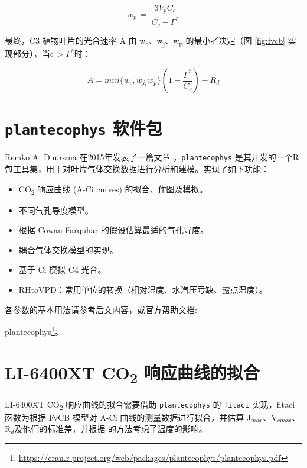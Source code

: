 \documentclass[]{krantz}
\providecommand{\tightlist}{%
  \setlength{\itemsep}{0pt}\setlength{\parskip}{0pt}}
\renewcommand{\href}[2]{#2\footnote{\url{#1}}}
\theoremstyle{definition}
\theoremstyle{definition}
\theoremstyle{definition}
\theoremstyle{remark}
\begin{document}
\begin{equation}
w_{p\ }=\ \frac{3V_{p}C_{c}}{C_{c}-\Gamma^{*}}
\end{equation}

最终，C3 植物叶片的光合速率 A 由
w\textsubscript{c}、w\textsubscript{j}、w\textsubscript{p}
的最小者决定（图 \ref{fig:fvcb} 实现部分），当c \textgreater{}
\(\Gamma^{*}\)时：

\begin{equation}
A=min\{w_{c},w_{j,}w_{p}\}(1-\frac{\Gamma^{*}}{C_{c}})-R_{d}
\end{equation}

\section{\texorpdfstring{\texttt{plantecophys}
软件包}{plantecophys 软件包}}\label{plantecophys-}

Remko A. Duursma 在2015年发表了一篇文章
\citet{Duursma2015Plantecophys}，\texttt{plantecophys}
是其开发的一个R包工具集，用于对叶片气体交换数据进行分析和建模。实现了如下功能：

\begin{itemize}
\tightlist
\item
  CO\textsubscript{2} 响应曲线 (A-Ci curves) 的拟合、作图及模拟。
\item
  不同气孔导度模型。
\item
  根据 Cowan-Farquhar 的假设估算最适的气孔导度。
\item
  耦合气体交换模型的实现。
\item
  基于 Ci 模拟 C4 光合。
\item
  RHtoVPD：常用单位的转换（相对湿度、水汽压亏缺、露点温度）。
\end{itemize}

各参数的基本用法请参考后文内容，或官方帮助文档:

\href{https://cran.r-project.org/web/packages/plantecophys/plantecophys.pdf}{plantecophys}。

\section{\texorpdfstring{LI-6400XT CO\textsubscript{2}
响应曲线的拟合}{LI-6400XT CO2 响应曲线的拟合}}\label{li-6400xt-co2-}

LI-6400XT CO\textsubscript{2} 响应曲线的拟合需要借助
\texttt{plantecophys} 的 \texttt{fitaci} 实现，fitaci 函数为根据 FvCB
模型对 A-Ci 曲线的测量数据进行拟合，并估算
J\(_{max}\)、V\(_{cmax}\)、R\(_{d}\)及他们的标准差，并根据
\citet{Medlyn2002Temperature} 的方法考虑了温度的影响。
\end{document}

